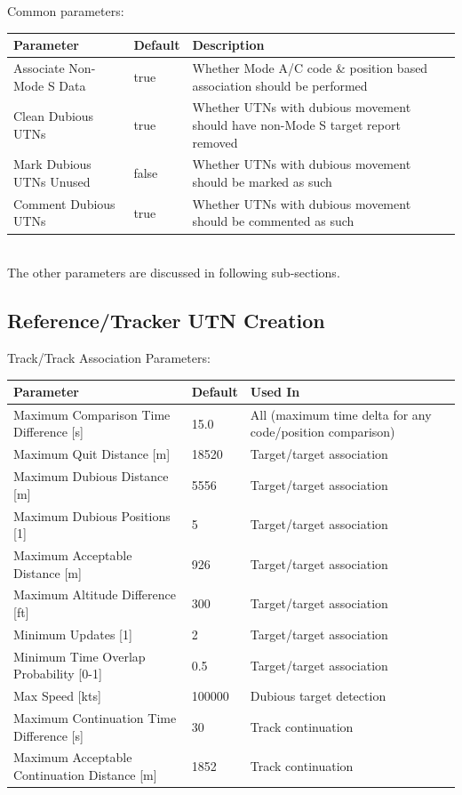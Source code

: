 Common parameters:
\begin{table}[H]
  \center
  \begin{tabularx}{\textwidth}{ | l | l | X |}
    \hline
    \textbf{Parameter} & \textbf{Default} &  \textbf{Description} \\ \hline
    Associate Non-Mode S Data & true & Whether Mode A/C code \& position based association should be performed \\ \hline
    Clean Dubious UTNs & true & Whether UTNs with dubious movement should have non-Mode S target report removed \\ \hline
    Mark Dubious UTNs Unused & false & Whether UTNs with dubious movement should be marked as such \\ \hline
    Comment Dubious UTNs & true & Whether UTNs with dubious movement should be commented as such \\ \hline
  \end{tabularx}
\end{table}
\ \\

The other parameters are discussed in following sub-sections.

\subsection{Reference/Tracker UTN Creation}

Track/Track Association Parameters:
\begin{table}[H]
  \center
  \begin{tabularx}{\textwidth}{ | X | l | X |}
    \hline
    \textbf{Parameter} & \textbf{Default} &  \textbf{Used In} \\ \hline
    Maximum Comparison Time Difference [s] & 15.0 & All (maximum time delta for any code/position comparison) \\ \hline
    Maximum Quit Distance [m] & 18520 & Target/target association \\ \hline
    Maximum Dubious Distance [m] & 5556 & Target/target association \\ \hline
    Maximum Dubious Positions [1] & 5 & Target/target association \\ \hline
    Maximum Acceptable Distance [m] & 926 & Target/target association \\ \hline
    Maximum Altitude Difference [ft] & 300 & Target/target association \\ \hline
    Minimum Updates [1] & 2 & Target/target association \\ \hline
    Minimum Time Overlap Probability [0-1] & 0.5 & Target/target association \\ \hline
    Max Speed [kts] & 100000 & Dubious target detection \\ \hline
    Maximum Continuation Time Difference [s] & 30 & Track continuation \\ \hline
    Maximum Acceptable Continuation Distance [m] & 1852 & Track continuation \\ \hline
  \end{tabularx}
\end{table}
\ \\

